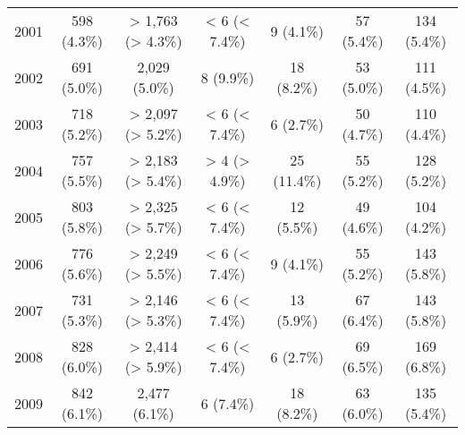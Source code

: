 \documentclass{article}
\begin{document}
\begin{table}[htbp]
\begin{longtable}{l*{6}{c}}
  2001                                                  &           598 (4.3\%)           &        > 1,763 (> 4.3\%)        &          < 6 (< 7.4\%)          &            9 (4.1\%)            &            57 (5.4\%)           &           134 (5.4\%)           \\
  2002                                                  &           691 (5.0\%)           &          2,029 (5.0\%)          &            8 (9.9\%)            &            18 (8.2\%)           &            53 (5.0\%)           &           111 (4.5\%)           \\
  2003                                                  &           718 (5.2\%)           &        > 2,097 (> 5.2\%)        &          < 6 (< 7.4\%)          &            6 (2.7\%)            &            50 (4.7\%)           &           110 (4.4\%)           \\
  2004                                                  &           757 (5.5\%)           &        > 2,183 (> 5.4\%)        &          > 4 (> 4.9\%)          &           25 (11.4\%)           &            55 (5.2\%)           &           128 (5.2\%)           \\
  2005                                                  &           803 (5.8\%)           &        > 2,325 (> 5.7\%)        &          < 6 (< 7.4\%)          &            12 (5.5\%)           &            49 (4.6\%)           &           104 (4.2\%)           \\
  2006                                                  &           776 (5.6\%)           &        > 2,249 (> 5.5\%)        &          < 6 (< 7.4\%)          &            9 (4.1\%)            &            55 (5.2\%)           &           143 (5.8\%)           \\
  2007                                                  &           731 (5.3\%)           &        > 2,146 (> 5.3\%)        &          < 6 (< 7.4\%)          &            13 (5.9\%)           &            67 (6.4\%)           &           143 (5.8\%)           \\
  2008                                                  &           828 (6.0\%)           &        > 2,414 (> 5.9\%)        &          < 6 (< 7.4\%)          &            6 (2.7\%)            &            69 (6.5\%)           &           169 (6.8\%)           \\
  2009                                                  &           842 (6.1\%)           &          2,477 (6.1\%)          &            6 (7.4\%)            &            18 (8.2\%)           &            63 (6.0\%)           &           135 (5.4\%)           \\

\end{longtable}
\end{table}
\end{document}
